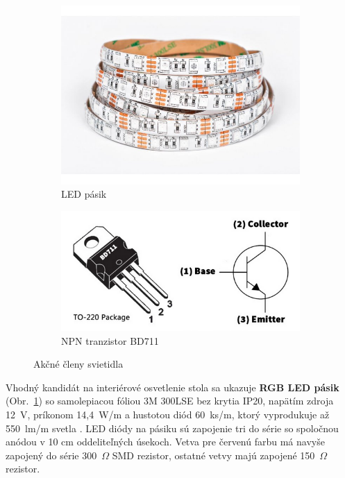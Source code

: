 \documentclass[12pt, a4paper]{article}
\begin{document}
\begin{figure}[h]
\centering
\begin{subfigure}[b]{0.45\textwidth}
	\centering
	\includegraphics[width=\textwidth]{assets/rgb-led.jpg}
	\caption{LED pásik}
	\label{fig:rgb-led}
\end{subfigure}
\hfill
\begin{subfigure}[b]{0.5\textwidth}
	\centering
	\includegraphics[width=\textwidth]{assets/bd711.png}
	\caption{NPN tranzistor BD711}
	\label{fig:bd-711}
\end{subfigure}
\caption{Akčné členy svietidla}
\end{figure}

Vhodný kandidát na interiérové osvetlenie stola sa ukazuje \textbf{RGB LED pásik} (Obr.~\ref{fig:rgb-led}) so samolepiacou fóliou 3M 300LSE bez krytia IP20, napätím zdroja 12~V, príkonom 14,4~W/m a hustotou diód 60~ks/m, ktorý vyprodukuje až 550~lm/m svetla \cite{123ledsk_rgb_nodate}. LED diódy na pásiku sú zapojenie tri do série so spoločnou anódou v 10 cm oddeliteľných úsekoch. Vetva pre červenú farbu má navyše zapojený do série 300~$\Omega$ SMD rezistor, ostatné vetvy majú zapojené 150~$\Omega$ rezistor.
\end{document}
